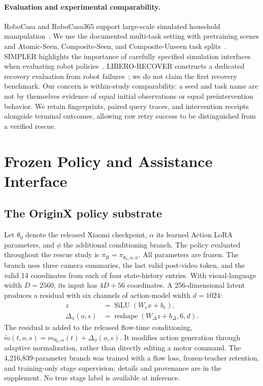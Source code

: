 \documentclass[10pt,twocolumn,letterpaper]{article}
\newcommand{\policy}{\pi_{\mathrm B}}
\begin{document}
\paragraph{Evaluation and experimental comparability.}
RoboCasa and RoboCasa365 support large-scale simulated household manipulation~\cite{robocasa,robocasa365}. We use the documented multi-task setting with pretraining scenes and Atomic-Seen, Composite-Seen, and Composite-Unseen task splits~\cite{protocol}. SIMPLER highlights the importance of carefully specified simulation interfaces when evaluating robot policies~\cite{simpler}. LIBERO-RECOVER constructs a dedicated recovery evaluation from robot failures~\cite{liberorecover}; we do not claim the first recovery benchmark. Our concern is within-study comparability: a seed and task name are not by themselves evidence of equal initial observations or equal preintervention behavior. We retain fingerprints, paired query traces, and intervention receipts alongside terminal outcomes, allowing raw retry success to be distinguished from a verified rescue.

\section{Frozen Policy and Assistance Interface}
\label{sec:method}
\subsection{The OriginX policy substrate}
Let $\theta_0$ denote the released Xiaomi checkpoint, $\alpha$ its learned Action LoRA parameters, and $\phi$ the additional conditioning branch. The policy evaluated throughout the rescue study is $\policy=\pi_{\theta_0,\alpha,\phi}$. All parameters are frozen. The branch uses three camera summaries, the last valid post-video token, and the valid 14 coordinates from each of four state-history entries. With visual-language width $D=2560$, its input has $4D+56$ coordinates. A 256-dimensional latent produces a residual with six channels of action-model width $d=1024$:
\begin{align}
z&=\operatorname{SiLU}(W_e x+b_e),\nonumber\\
\Delta_\phi(o,s)&=\operatorname{reshape}(W_\Delta z+b_\Delta,6,d).\label{eq:branch}
\end{align}
The residual is added to the released flow-time conditioning, $\widetilde m(t,o,s)=m_{\theta_0,\alpha}(t)+\Delta_\phi(o,s)$. It modifies action generation through adaptive normalization, rather than directly editing a motor command. The 4,216,839-parameter branch was trained with a flow loss, frozen-teacher retention, and training-only stage supervision; details and provenance are in the supplement. No true stage label is available at inference.
\end{document}
